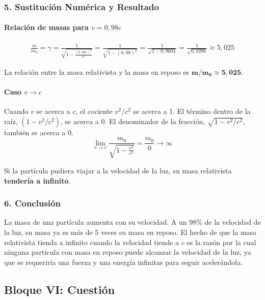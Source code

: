 \subsubsection*{5. Sustitución Numérica y Resultado}
\paragraph{Relación de masas para $v=0,98c$}
\begin{gather}
    \frac{m}{m_0} = \gamma = \frac{1}{\sqrt{1 - \frac{(0,98c)^2}{c^2}}} = \frac{1}{\sqrt{1 - (0,98)^2}} = \frac{1}{\sqrt{1 - 0,9604}} = \frac{1}{\sqrt{0,0396}} \approx 5,025
\end{gather}
\begin{cajaresultado}
La relación entre la masa relativista y la masa en reposo es $\boldsymbol{m/m_0 \approx 5,025}$.
\end{cajaresultado}

\paragraph{Caso $v \to c$}
Cuando $v$ se acerca a $c$, el cociente $v^2/c^2$ se acerca a 1. El término dentro de la raíz, $(1-v^2/c^2)$, se acerca a 0. El denominador de la fracción, $\sqrt{1-v^2/c^2}$, también se acerca a 0.
$$ \lim_{v \to c} \frac{m_0}{\sqrt{1 - \frac{v^2}{c^2}}} = \frac{m_0}{0} \to \infty $$
\begin{cajaresultado}
Si la partícula pudiera viajar a la velocidad de la luz, su masa relativista \textbf{tendería a infinito}.
\end{cajaresultado}

\subsubsection*{6. Conclusión}
\begin{cajaconclusion}
La masa de una partícula aumenta con su velocidad. A un 98\% de la velocidad de la luz, su masa ya es más de 5 veces su masa en reposo. El hecho de que la masa relativista tienda a infinito cuando la velocidad tiende a $c$ es la razón por la cual ninguna partícula con masa en reposo puede alcanzar la velocidad de la luz, ya que se requeriría una fuerza y una energía infinitas para seguir acelerándola.
\end{cajaconclusion}

\newpage

\subsection{Bloque VI: Cuestión}
\label{subsec:A6_2011_jun_ord}

